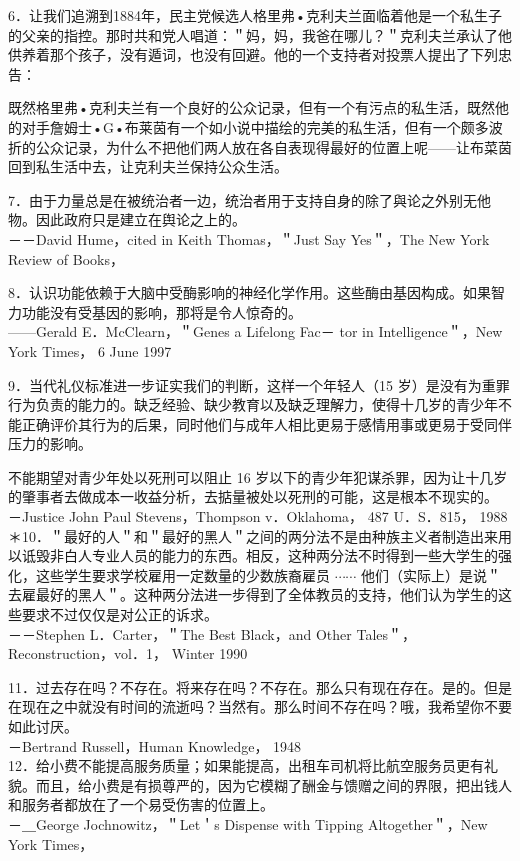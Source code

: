 6．让我们追溯到1884年，民主党候选人格里弗•克利夫兰面临着他是一个私生子的父亲的指控。那时共和党人唱道：＂妈，妈，我爸在哪儿？＂克利夫兰承认了他供养着那个孩子，没有遁词，也没有回避。他的一个支持者对投票人提出了下列忠告：

既然格里弗•克利夫兰有一个良好的公众记录，但有一个有污点的私生活，既然他的对手詹姆士•G•布莱茵有一个如小说中描绘的完美的私生活，但有一个颇多波折的公众记录，为什么不把他们两人放在各自表现得最好的位置上呢——让布菜茵回到私生活中去，让克利夫兰保持公众生活。

7．由于力量总是在被统治者一边，统治者用于支持自身的除了與论之外别无他物。因此政府只是建立在舆论之上的。\\
－－David Hume，cited in Keith Thomas，＂Just Say Yes＂，The New York Review of Books，

8．认识功能依赖于大脑中受酶影响的神经化学作用。这些酶由基因构成。如果智力功能没有受基因的影响，那将是令人惊奇的。\\
——Gerald E．McClearn，＂Genes a Lifelong Fac－ tor in Intelligence＂，New York Times， 6 June 1997

9．当代礼仪标准进一步证实我们的判断，这样一个年轻人（15 岁）是没有为重罪行为负责的能力的。缺乏经验、缺少教育以及缺乏理解力，使得十几岁的青少年不能正确评价其行为的后果，同时他们与成年人相比更易于感情用事或更易于受同伴压力的影响。

不能期望对青少年处以死刑可以阻止 16 岁以下的青少年犯谋杀罪，因为让十几岁的肇事者去做成本一收益分析，去掂量被处以死刑的可能，这是根本不现实的。\\
－Justice John Paul Stevens，Thompson v．Oklahoma， 487 U．S．815， 1988\\
＊10．＂最好的人＂和＂最好的黑人＂之间的两分法不是由种族主义者制造出来用以诋毁非白人专业人员的能力的东西。相反，这种两分法不时得到一些大学生的强化，这些学生要求学校雇用一定数量的少数族裔雇员 $\cdots \cdots$ 他们（实际上）是说＂去雇最好的黑人＂。这种两分法进一步得到了全体教员的支持，他们认为学生的这些要求不过仅仅是对公正的诉求。\\
－－Stephen L．Carter，＂The Best Black，and Other Tales＂，Reconstruction，vol．1， Winter 1990

11．过去存在吗？不存在。将来存在吗？不存在。那么只有现在存在。是的。但是在现在之中就没有时间的流逝吗？当然有。那么时间不存在吗？哦，我希望你不要如此讨厌。\\
－Bertrand Russell，Human Knowledge， 1948\\
12．给小费不能提高服务质量；如果能提高，出租车司机将比航空服务员更有礼貌。而且，给小费是有损尊严的，因为它模糊了酬金与馈赠之间的界限，把出钱人和服务者都放在了一个易受伤害的位置上。\\
－＿George Jochnowitz，＂Let＇s Dispense with Tipping Altogether＂，New York Times，

